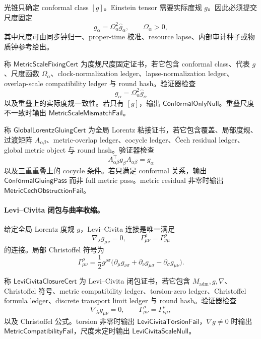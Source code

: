 光锥只确定 conformal class \([g]\)。Einstein tensor 需要实际度规 \(g\)。因此必须提交尺度固定
\[
g_\alpha=\Omega_\alpha^2\widehat g_\alpha,
\qquad
\Omega_\alpha>0,
\]
其中尺度可由同步钟归一、proper-time 校准、resource lapse、内部审计种子或物质钟参考给出。

\begin{definition}[度规尺度固定证书]\label{def:typed-address-biaxial-completion-metric-scale-fixing-cert}
称 \(\mathsf{MetricScaleFixingCert}\) 为度规尺度固定证书，若它包含 conformal class、代表 \(g\)、尺度函数 \(\Omega_\alpha\)、clock-normalization ledger、lapse-normalization ledger、overlap-scale compatibility ledger 与 round hash。验证器检查
\[
g_\alpha=\Omega_\alpha^2\widehat g_\alpha
\]
以及重叠上的实际度规一致性。若只有 \([g]\)，输出 \(\mathsf{ConformalOnlyNull}\)。重叠尺度不一致时输出 \(\mathsf{MetricScaleMismatchFail}\)。
\end{definition}

\begin{definition}\label{def:typed-address-biaxial-completion-global-lorentz-gluing-cert}
称 \(\mathsf{GlobalLorentzGluingCert}\) 为全局 Lorentz 粘接证书，若它包含覆盖、局部度规、过渡矩阵 \(A_{\alpha\beta}\)、metric-overlap ledger、cocycle ledger、\v{C}ech residual ledger、global metric object 与 round hash。验证器检查
\[
A_{\alpha\beta}^{\top}g_\beta A_{\alpha\beta}=g_\alpha
\]
以及三重重叠上的 cocycle 条件。若只满足 conformal 关系，输出 \(\mathsf{ConformalGluingPass}\) 而非 full metric pass。metric residual 非零时输出 \(\mathsf{MetricCechObstructionFail}\)。
\end{definition}

\paragraph{Levi--Civita 闭包与曲率收缩。}
给定全局 Lorentz 度规 \(g\)，Levi--Civita 连接是唯一满足
\[
\nabla_\lambda g_{\mu\nu}=0,
\qquad
\Gamma^\rho_{\mu\nu}=\Gamma^\rho_{\nu\mu}
\]
的连接。局部 Christoffel 符号为
\[
\boxed{
\Gamma^\rho_{\mu\nu}
=
\frac12g^{\rho\sigma}
\bigl(
\partial_\mu g_{\nu\sigma}
+
\partial_\nu g_{\mu\sigma}
-
\partial_\sigma g_{\mu\nu}
\bigr).
}
\]

\begin{definition}\label{def:typed-address-biaxial-completion-levi-civita-closure-cert}
称 \(\mathsf{LeviCivitaClosureCert}\) 为 Levi--Civita 闭包证书，若它包含 \(M_{\mathrm{adm}},g,\nabla\)、Christoffel 符号、metric compatibility ledger、torsion-zero ledger、Christoffel formula ledger、discrete transport limit ledger 与 round hash。验证器检查
\[
\nabla_\lambda g_{\mu\nu}=0,
\qquad
\Gamma^\rho_{\mu\nu}=\Gamma^\rho_{\nu\mu},
\]
以及 Christoffel 公式。torsion 非零时输出 \(\mathsf{LeviCivitaTorsionFail}\)，\(\nabla g\neq0\) 时输出 \(\mathsf{MetricCompatibilityFail}\)，尺度未定时输出 \(\mathsf{LeviCivitaScaleNull}\)。
\end{definition}

